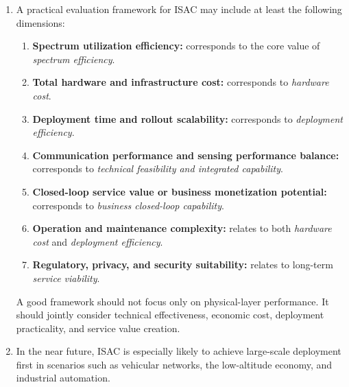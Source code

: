 \begin{enumerate}[label=\textbf{\arabic*.}, leftmargin=*]
    First, they may become \emph{environmental information service providers} by offering location, motion, occupancy, traffic-state, or situational-awareness services to industries and governments. Second, by combining sensing with edge computing and AI, operators may further develop into \emph{decision-support platforms}, helping customers optimize logistics, traffic management, public safety, industrial control, and resource scheduling.

    This does not mean connectivity becomes unimportant. Rather, connectivity becomes one layer of a broader integrated service stack. In such a future, operators may create value not only by transporting data, but also by generating and exploiting physical-world information.

    \item 
    A practical evaluation framework for ISAC may include at least the following dimensions:

    \begin{enumerate}[label=(\alph*)]
        \item \textbf{Spectrum utilization efficiency:} corresponds to the core value of \emph{spectrum efficiency}.
        \item \textbf{Total hardware and infrastructure cost:} corresponds to \emph{hardware cost}.
        \item \textbf{Deployment time and rollout scalability:} corresponds to \emph{deployment efficiency}.
        \item \textbf{Communication performance and sensing performance balance:} corresponds to \emph{technical feasibility and integrated capability}.
        \item \textbf{Closed-loop service value or business monetization potential:} corresponds to \emph{business closed-loop capability}.
        \item \textbf{Operation and maintenance complexity:} relates to both \emph{hardware cost} and \emph{deployment efficiency}.
        \item \textbf{Regulatory, privacy, and security suitability:} relates to long-term \emph{service viability}.
    \end{enumerate}

    A good framework should not focus only on physical-layer performance. It should jointly consider technical effectiveness, economic cost, deployment practicality, and service value creation.

    \item 
    In the near future, ISAC is especially likely to achieve large-scale deployment first in scenarios such as vehicular networks, the low-altitude economy, and industrial automation.


\end{enumerate}
